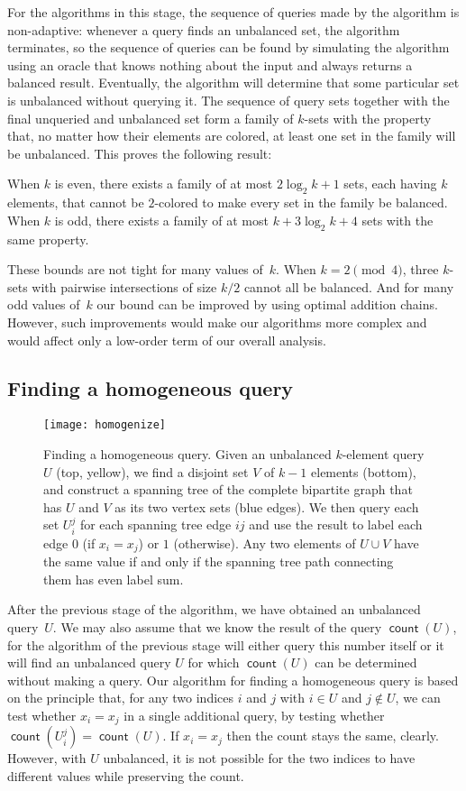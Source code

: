 \documentclass[11pt]{llncs}
\newcommand{\figurescale}{0.5}
\newcommand{\figurescale}{0.45}
\newcommand{\qcount}{\operatorname{\mathsf{count}}}
\begin{document}
For the algorithms in this stage, the sequence of queries made by the algorithm is non-adaptive: whenever a query finds an unbalanced set, the algorithm terminates, so the sequence of queries can be found by simulating the algorithm using an oracle that knows nothing about the input and always returns a balanced result. Eventually, the algorithm will determine that some particular set is unbalanced without querying it. The sequence of query sets together with the final unqueried and unbalanced set form a family of $k$-sets with the property that, no matter how their elements are colored, at least one set in the family will be unbalanced. This proves the following result:

\begin{theorem}
When $k$ is even, there exists a family of at most $2\log_2 k + 1$ sets, each having $k$ elements, that cannot be $2$-colored to make every set in the family be balanced. When $k$ is odd, there exists a family of at most $k+3\log_2 k+4$ sets with the same property.
\end{theorem} 

These bounds are not tight for many values of~$k$. When $k=2\pmod 4$,
three $k$-sets with pairwise intersections of size $k/2$ cannot all be balanced. And for many odd values of~$k$ our bound can be improved by using optimal addition chains. However, such improvements would make our algorithms more complex and would affect only a low-order term of our overall analysis.

\subsection{Finding a homogeneous query}

\begin{figure}[t]
\centering\texttt{[image: homogenize]}
\caption{Finding a homogeneous query. Given an unbalanced $k$-element query $U$ (top, yellow), we find a disjoint set $V$ of $k-1$ elements (bottom), and construct a spanning tree of the complete bipartite graph that has $U$ and $V$ as its two vertex sets (blue edges). We then query each set $U_i^j$ for each spanning tree edge $ij$ and use the result to label each edge $0$ (if $x_i=x_j$) or $1$ (otherwise). Any two elements of $U\cup V$ have the same value if and only if the spanning tree path connecting them has even label sum.}
\label{fig:homogenize}
\end{figure}

After the previous stage of the algorithm, we have obtained an unbalanced query~$U$. We may also assume that we know the result of the query $\qcount(U)$, for the algorithm of the previous stage will either query this number itself or it will find an unbalanced query $U$ for which $\qcount(U)$ can be determined without making a query. Our algorithm for finding a homogeneous query is based on the principle that, for any two indices $i$ and $j$ with $i\in U$ and $j\notin U$, we can test whether $x_i=x_j$ in a single additional query, by testing whether $\qcount(U_i^j)=\qcount(U)$. If $x_i=x_j$ then the count stays the same, clearly. However, with $U$ unbalanced, it is not possible for the two indices to have different values while preserving the count.
\end{document}
